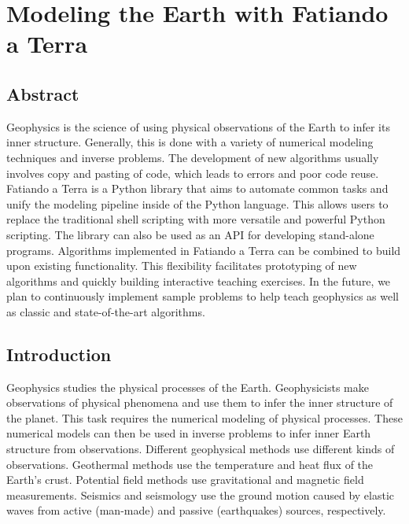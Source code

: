 \chapter{Modeling the Earth with Fatiando a Terra}\label{chap:fatiando}



\section{Abstract}

Geophysics is the science of using physical observations of the Earth to
infer its inner structure. Generally, this is done with a variety of
numerical modeling techniques and inverse problems. The development of
new algorithms usually involves copy and pasting of code, which leads to
errors and poor code reuse. Fatiando a Terra is a Python library that
aims to automate common tasks and unify the modeling pipeline inside of
the Python language. This allows users to replace the traditional shell
scripting with more versatile and powerful Python scripting. The library
can also be used as an API for developing stand-alone programs.
Algorithms implemented in Fatiando a Terra can be combined to build upon
existing functionality. This flexibility facilitates prototyping of new
algorithms and quickly building interactive teaching exercises. In the
future, we plan to continuously implement sample problems to help teach
geophysics as well as classic and state-of-the-art algorithms.




\section{Introduction}

Geophysics studies the physical processes of the Earth. Geophysicists
make observations of physical phenomena and use them to infer the inner
structure of the planet. This task requires the numerical modeling of
physical processes. These numerical models can then be used in inverse
problems to infer inner Earth structure from observations. Different
geophysical methods use different kinds of observations. Geothermal
methods use the temperature and heat flux of the Earth's crust.
Potential field methods use gravitational and magnetic field
measurements. Seismics and seismology use the ground motion caused by
elastic waves from active (man-made) and passive (earthquakes) sources,
respectively.

